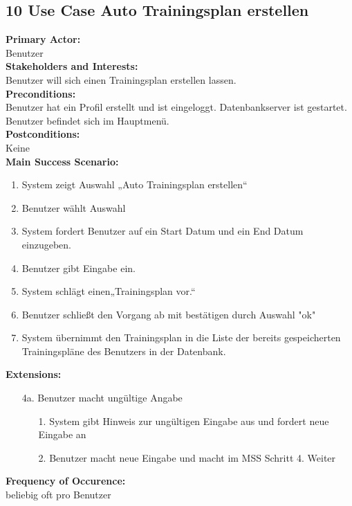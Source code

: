 \documentclass[12pt,a4paper,onecolumn]{article}
\begin{document}
\subsection{10 Use Case  Auto Trainingsplan erstellen}
\textbf{Primary Actor:}\\ Benutzer\\
\textbf{Stakeholders and Interests:}\\
Benutzer will sich einen \gls{Trainingsplan} erstellen lassen.\\
\textbf{Preconditions:} \\ Benutzer hat ein Profil erstellt und ist eingeloggt. 
Datenbankserver ist gestartet. Benutzer befindet sich im Hauptmenü.\\
\textbf{Postconditions:}\\Keine\\
\textbf{Main Success Scenario:}
\begin{enumerate}
    \item System zeigt Auswahl „Auto Trainingsplan erstellen“
    \item Benutzer wählt Auswahl
    \item System fordert Benutzer auf ein Start Datum und ein End Datum einzugeben. 
    \item Benutzer gibt Eingabe ein.
    \item System schlägt einen„\gls{Trainingsplan} vor.“
    \item Benutzer schließt den Vorgang ab mit bestätigen durch Auswahl "ok"
    \item System übernimmt den \gls{Trainingsplan} in die Liste der bereits gespeicherten Trainingspläne des Benutzers in der Datenbank.
\end{enumerate}
\textbf{Extensions:}
\begin{enumerate}
    \item [4a.]   Benutzer macht ungültige Angabe
    \begin{enumerate}
        \item[1.]System gibt Hinweis zur ungültigen Eingabe aus und fordert neue Eingabe an
        \item[2.]Benutzer macht neue Eingabe und macht im MSS Schritt 4. Weiter
    \end{enumerate}
    
    
    
\end{enumerate}
\textbf{Frequency of Occurence:}\\beliebig oft pro Benutzer  \\

\printglossary
\end{document}
